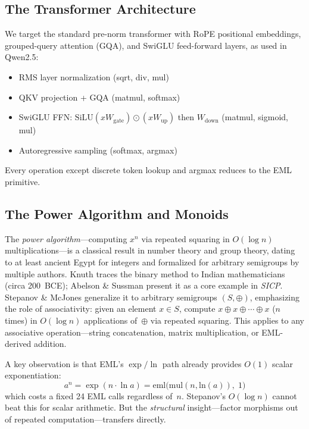 \documentclass[acmsmall,nonacm]{acmart}
\begin{document}
\subsection{The Transformer Architecture}

We target the standard pre-norm transformer with RoPE positional
embeddings, grouped-query attention (GQA), and SwiGLU feed-forward
layers, as used in Qwen2.5:
\begin{itemize}
\item RMS layer normalization (sqrt, div, mul)
\item QKV projection + GQA (matmul, softmax)
\item SwiGLU FFN: $\mathrm{SiLU}(xW_{\text{gate}}) \odot (xW_{\text{up}})$ then $W_{\text{down}}$ (matmul, sigmoid, mul)
\item Autoregressive sampling (softmax, argmax)
\end{itemize}
Every operation except discrete token lookup and argmax reduces to the
EML primitive.

\subsection{The Power Algorithm and Monoids}

The \emph{power algorithm}---computing $x^n$ via repeated squaring in
$O(\log n)$ multiplications---is a classical result in number theory
and group theory, dating to at least ancient Egypt for integers and
formalized for arbitrary semigroups by multiple authors.  Knuth
\cite{knuth1997} traces the binary method to Indian mathematicians
(circa 200~BCE); Abelson \& Sussman \cite{sicp} present it as a core
example in \emph{SICP}.  Stepanov \& McJones \cite{stepanov2009}
generalize it to arbitrary semigroups $(S, \oplus)$, emphasizing the
role of associativity: given an element $x \in S$, compute
$x \oplus x \oplus \cdots \oplus x$ ($n$ times) in $O(\log n)$
applications of~$\oplus$ via repeated squaring.  This applies to any
associative operation---string concatenation, matrix multiplication,
or EML-derived addition.

A key observation is that EML's $\exp/\ln$ path already provides
$O(1)$ scalar exponentiation:
\[
  a^n = \exp(n \cdot \ln a) = \mathrm{eml}\!\Big(\mathrm{mul}(n, \mathrm{ln}(a)),\; 1\Big)
\]
which costs a fixed 24 EML calls regardless of~$n$.  Stepanov's
$O(\log n)$ cannot beat this for scalar arithmetic.  But the
\emph{structural} insight---factor morphisms out of repeated
computation---transfers directly.
\end{document}
